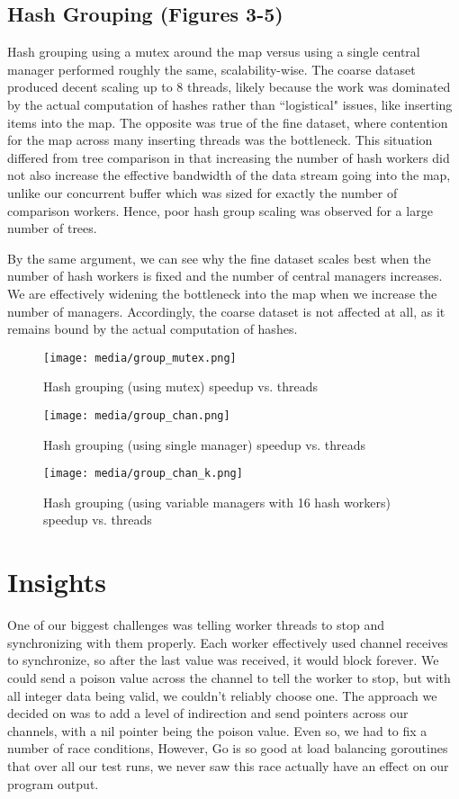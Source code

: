\documentclass[11pt]{article}
\begin{document}
\subsection{Hash Grouping (Figures 3-5)}
Hash grouping using a mutex around the map versus using a single central manager performed roughly the same, scalability-wise. The coarse dataset produced decent scaling up to 8 threads, likely because the work was dominated by the actual computation of hashes rather than ``logistical" issues, like inserting items into the map. The opposite was true of the fine dataset, where contention for the map across many inserting threads was the bottleneck. This situation differed from tree comparison in that increasing the number of hash workers did not also increase the effective bandwidth of the data stream going into the map, unlike our concurrent buffer which was sized for exactly the number of comparison workers. Hence, poor hash group scaling was observed for a large number of trees.

By the same argument, we can see why the fine dataset scales best when the number of hash workers is fixed and the number of central managers increases. We are effectively widening the bottleneck into the map when we increase the number of managers. Accordingly, the coarse dataset is not affected at all, as it remains bound by the actual computation of hashes.

\begin{figure}[t]
    \centering
    \texttt{[image: media/group\_mutex.png]}
    \caption{Hash grouping (using mutex) speedup vs. threads}
\end{figure}

\begin{figure}[t]
    \centering
    \texttt{[image: media/group\_chan.png]}
    \caption{Hash grouping (using single manager) speedup vs. threads}
\end{figure}

\begin{figure}[t]
    \centering
    \texttt{[image: media/group\_chan\_k.png]}
    \caption{Hash grouping (using variable managers with 16 hash workers) speedup vs. threads}
\end{figure}

\section{Insights}
One of our biggest challenges was telling worker threads to stop and synchronizing with them properly. Each worker effectively used channel receives to synchronize, so after the last value was received, it would block forever. We could send a poison value across the channel to tell the worker to stop, but with all integer data being valid, we couldn't reliably choose one. The approach we decided on was to add a level of indirection and send pointers across our channels, with a nil pointer being the poison value. Even so, we had to fix a number of race conditions,  However, Go is so good at load balancing goroutines that over all our test runs, we never saw this race actually have an effect on our program output. 
\end{document}
